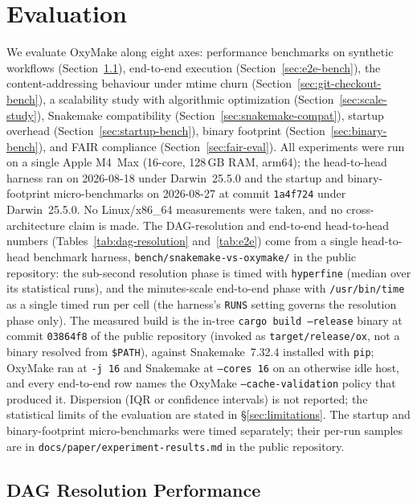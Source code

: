 \documentclass[12pt,a4paper]{article}
\newcommand{\code}[1]{{\texttt{\small\color{inlinecode}#1}}}
\begin{document}
\section{Evaluation}
\label{sec:evaluation}

We evaluate OxyMake along eight axes: performance benchmarks on synthetic
workflows (Section~\ref{sec:perf-bench}), end-to-end execution
(Section~\ref{sec:e2e-bench}), the content-addressing
behaviour under mtime churn (Section~\ref{sec:git-checkout-bench}), a
scalability study with
algorithmic optimization (Section~\ref{sec:scale-study}), Snakemake
compatibility (Section~\ref{sec:snakemake-compat}), startup overhead
(Section~\ref{sec:startup-bench}), binary footprint
(Section~\ref{sec:binary-bench}), and FAIR compliance
(Section~\ref{sec:fair-eval}). All experiments were run on a single Apple
M4~Max (16-core, 128\,GB RAM, arm64); the head-to-head harness ran on
2026-08-18 under Darwin~25.5.0 and the startup and binary-footprint
micro-benchmarks on 2026-08-27 at commit \code{1a4f724} under
Darwin~25.5.0. No
Linux/x86\_64 measurements were taken, and no cross-architecture claim
is made. The DAG-resolution
and end-to-end head-to-head numbers (Tables~\ref{tab:dag-resolution}
and~\ref{tab:e2e}) come from a single head-to-head benchmark harness,
\code{bench/snakemake-vs-oxymake/} in the public repository: the
sub-second resolution phase is
timed with \code{hyperfine} (median over its statistical runs), and the
minutes-scale end-to-end phase with \code{/usr/bin/time} as a single
timed run per cell (the harness's \code{RUNS} setting governs the
resolution phase only). The measured build is the in-tree
\code{cargo build --release} binary at commit \code{03864f8} of the
public repository (invoked as \code{target/release/ox}, not a binary
resolved from \code{\$PATH}), against Snakemake~7.32.4 installed with
\code{pip}; OxyMake ran at \code{-j 16} and Snakemake at
\code{--cores 16} on an otherwise idle host, and every end-to-end row
names the OxyMake \code{--cache-validation} policy that produced it.
Dispersion (IQR or confidence intervals) is not
reported; the statistical limits of the evaluation are stated in
\S\ref{sec:limitations}. The startup and binary-footprint
micro-benchmarks were timed separately; their per-run samples are in
\code{docs/paper/experiment-results.md} in the public repository.

\subsection{DAG Resolution Performance}
\label{sec:perf-bench}
\end{document}
